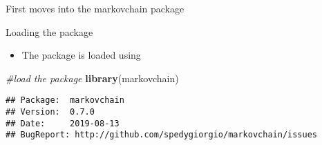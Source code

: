 \documentclass[ignorenonframetext,]{beamer}
\newenvironment{Shaded}{\begin{snugshade}}{\end{snugshade}}
\newcommand{\CommentTok}[1]{\textcolor[rgb]{0.56,0.35,0.01}{\textit{#1}}}
\newcommand{\KeywordTok}[1]{\textcolor[rgb]{0.13,0.29,0.53}{\textbf{#1}}}
\newcommand{\NormalTok}[1]{#1}
\providecommand{\tightlist}{%
  \setlength{\itemsep}{0pt}\setlength{\parskip}{0pt}}
\providecommand{\tightlist}{
  \setlength{\itemsep}{0pt}\setlength{\parskip}{0pt}
}
\begin{document}
\begin{frame}[fragile]{First moves into the markovchain package}
\protect\hypertarget{first-moves-into-the-markovchain-package}{}

\begin{block}{Loading the package}

\begin{itemize}
\tightlist
\item
  The package is loaded using
\end{itemize}

\begin{Shaded}
\begin{Highlighting}[]
\CommentTok{#load the package}
\KeywordTok{library}\NormalTok{(markovchain) }
\end{Highlighting}
\end{Shaded}

\begin{verbatim}
## Package:  markovchain
## Version:  0.7.0
## Date:     2019-08-13
## BugReport: http://github.com/spedygiorgio/markovchain/issues
\end{verbatim}

\end{block}

\end{frame}
\end{document}
